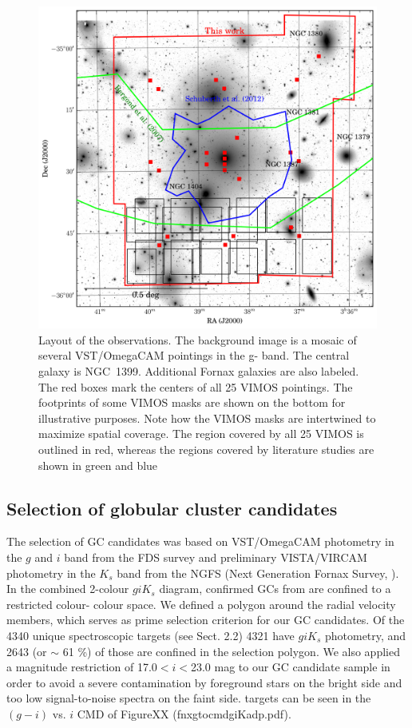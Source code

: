 \documentclass[useAMS,usenatbib]{mn2e}
\begin{document}
\begin{figure}
\centering
\includegraphics[scale=0.7]{figures/fov.png} 
\caption{Layout of the observations. The background image is a mosaic of 
several VST/OmegaCAM pointings in the g-
band. The central galaxy is NGC~1399. Additional Fornax galaxies are also 
labeled. The red boxes mark the centers of all 
25 VIMOS pointings. The footprints of some VIMOS masks are shown on the bottom 
for illustrative purposes. Note how 
the VIMOS masks are intertwined to maximize spatial coverage. The region 
covered by all 25 VIMOS is outlined in red, 
whereas the regions covered by literature studies are shown in green 
\citep{Bergond07} and blue \citep{Schuberth}}
\label{fig:fov}
\end{figure}

\subsection{Selection of globular cluster candidates}
\label{sec:selectionGC}
The selection of GC candidates was based on VST/OmegaCAM photometry in the $g$ 
and $i$ band from the FDS survey 
\citep{DAbrusco16,Iodice16} and preliminary VISTA/VIRCAM photometry in the 
$K_s$ band from the NGFS (Next 
Generation Fornax Survey, \citealt{Munoz14}). 
In the combined 2-colour $giK_s$ diagram, confirmed GCs from \citet{Schuberth} 
are confined to a restricted colour-
colour space. 
We defined a polygon around the radial velocity members, which serves as prime 
selection criterion for our GC candidates. 
Of the 4340 unique spectroscopic targets (see Sect. 2.2) 4321 have $giK_s$ 
photometry, and 2643 (or $\sim$ 61 \%) of those are confined in the selection 
polygon. 
We also applied a magnitude restriction of 17.0$<i<$23.0 mag to our GC 
candidate sample in order to avoid a severe contamination by foreground stars 
on the bright side and too low signal-to-noise spectra on the faint side. 
targets can be seen in the $(g-i)$ vs. $i$ CMD of FigureXX 
(fnxgtocmdgiKadp.pdf).
\end{document}
